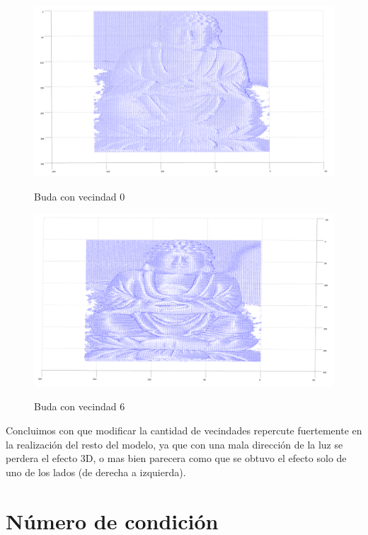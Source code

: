 \begin{figure}[h]
   \includegraphics[scale=0.4]{buda_vecindad_0.png}
   \label{Fig. 2}
   \caption{Buda con vecindad 0}
\end{figure}

\begin{figure}[h]
   \includegraphics[scale=0.4]{buda_vecindades_6.png}
   \label{Fig. 3}
   \caption{Buda con vecindad 6}
\end{figure}



Concluimos con que modificar la cantidad de vecindades repercute fuertemente en la realización del resto del modelo, ya que con una mala dirección de la luz se perdera el efecto 3D, o mas bien parecera como que se obtuvo el efecto solo de uno de los lados (de derecha a izquierda). \par



\section{Número de condición}

